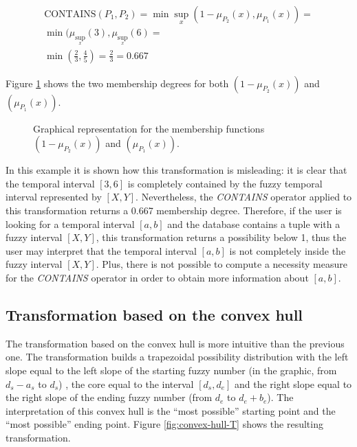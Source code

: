 \documentclass[twoside,twocolumn,a4paper]{article}
\begin{document}
\begin{eqnarray}
\nonumber
\mbox{CONTAINS}\left(P_1,P_2 \right) = \min \sup_{x} \left(1-\mu_{P_2}(x),\mu_{P_1}(x) \right) = \\
\nonumber
 \min (\mu_{\sup_x}(3),\mu_{\sup_x}(6) = \\
\nonumber
\min (\frac{2}{3},\frac{4}{5}) = \frac{2}{3} = 0.667
\end{eqnarray}

Figure \ref{fig:example_pi} shows the two membership degrees for both $\left(1-\mu_{P_2}(x)\right)$ and $\left( \mu_{P_1}(x) \right)$.

\begin{figure}[h!]
  \centering
  
  \caption{Graphical representation for the membership functions $\left(1-\mu_{P_2}(x)\right)$ and $\left( \mu_{P_1}(x) \right) $.}
  \label{fig:example_pi}
\end{figure}

In this example it is shown how this transformation is misleading: it is clear that the temporal interval $[3,6]$ is completely contained by the fuzzy temporal interval represented by $[X,Y]$. Nevertheless, the \emph{CONTAINS} operator applied to this transformation returns a 0.667 membership degree. Therefore, if the user is looking for a temporal interval $[a,b]$ and the database contains a tuple with a fuzzy interval $[X,Y]$, this transformation returns a possibility below 1, thus the user may interpret that the temporal interval $[a,b]$ is not completely inside the fuzzy interval $[X,Y]$. Plus, there is not possible to compute a necessity measure for the \emph{CONTAINS} operator in order to obtain more information about $[a,b]$.





\subsection{\label{subsubsec:trans-convex-hull}Transformation based on the convex hull}
The transformation based on the convex hull is more intuitive than the previous one. The transformation builds a trapezoidal possibility distribution with the left slope equal to the left slope of the starting fuzzy number (in the graphic, from $d_s-a_s$ to $d_s$) , the core equal to the interval $[d_s,d_e]$ and the right slope equal to the right slope of the ending fuzzy number (from $d_e$ to $d_e+b_e$). The interpretation of this convex hull is the ``most possible'' starting point and the ``most possible'' ending point. Figure \ref{fig:convex-hull-T} shows the resulting transformation.
\end{document}
